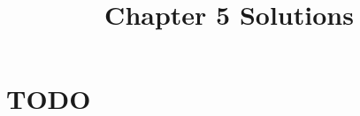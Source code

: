 \documentclass[12pt]{article}
\title{Chapter 5 Solutions}
\begin{document}
\section{TODO}
\end{document}
